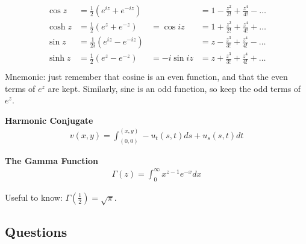 \begin{align*}\begin{aligned}
%   
\cos z 
&= \frac{1}{2}(e^{iz} + e^{-iz})
&
&= 1 - \frac{z^2}{2!} + \frac{z^4}{4!} - \ldots \\
%
\cosh z 
&= \frac{1}{2}(e^{z} + e^{-z}) 
&= \cos iz 
&= 1 + \frac{z^2}{2!} + \frac{z^4}{4!} + \ldots \\
%
\sin z 
&= \frac{1}{2i}(e^{iz} - e^{-iz}) 
&
&= z - \frac{z^3}{3!} + \frac{z^4}{4!} - \ldots \\
%
\sinh z 
&= \frac{1}{2}(e^{z} - e^{-z}) 
&= -i\sin iz 
&= z + \frac{z^3}{3!} + \frac{z^4}{4!} + \ldots \\\end{aligned}\end{align*}
Mnemonic: just remember that cosine is an even function, and that the
even terms of \(e^z\) are kept. Similarly, sine is an odd function, so
keep the odd terms of \(e^z\).

\textbf{Harmonic Conjugate}
\begin{align*}v(x,y) = \int_{(0,0)}^{(x,y)} -u_t(s,t)ds + u_s(s,t)dt\end{align*}

\textbf{The Gamma Function}
\begin{align*}\Gamma(z) = \int_0^\infty x^{z-1} e^{-x} dx\end{align*}

Useful to know: \(\Gamma(\frac{1}{2}) = \sqrt\pi\).

\hypertarget{questions}{%
\subsection{Questions}\label{questions}}

